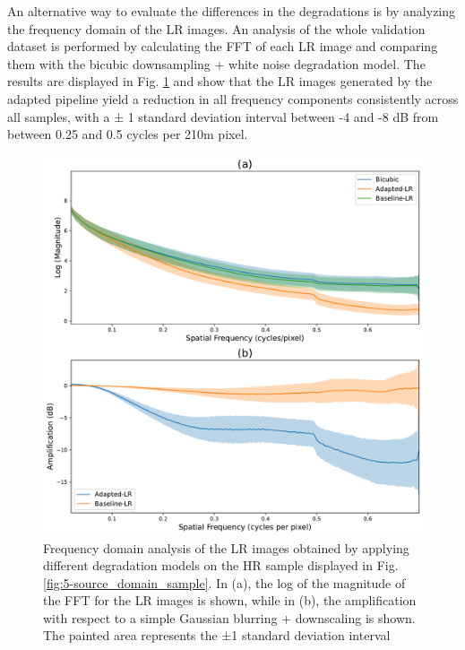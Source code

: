        An alternative way to evaluate the differences in the degradations is by analyzing the frequency domain of the LR images.
        An analysis of the whole validation dataset is performed by calculating the FFT of each LR image and comparing them with the bicubic downsampling + white noise degradation model.
        The results are displayed in Fig. \ref{fig:5-lr-images-fft-comparison} and show that the LR images generated by the adapted pipeline yield a reduction in all frequency components consistently across all samples, with a ± 1 standard deviation interval between -4 and -8 dB from between 0.25 and 0.5 cycles per 210m pixel.

        \begin{figure}[H]
            \centering
            \includegraphics[scale=0.5]{Includes/5-source-lr-amplification-statistics.pdf}
            \caption{Frequency domain analysis of the LR images obtained by applying different degradation models on the HR sample displayed in Fig. \ref{fig:5-source_domain_sample}.
                     In (a), the log of the magnitude of the FFT for the LR images is shown,
                     while in (b), the amplification with respect to a  simple Gaussian blurring + downscaling is shown.
                     The painted area represents the ±1 standard deviation interval}
            \label{fig:5-lr-images-fft-comparison}
        \end{figure}




